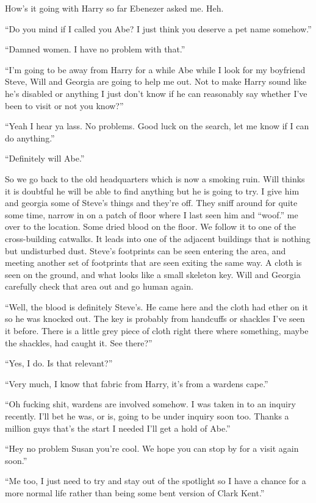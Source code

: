 \lettrine[lines=2,lraise=0]{H}ow's it going with Harry so far Ebenezer asked me. Heh.

``Do you mind if I called you Abe? I just think you deserve a pet name somehow.''

``Damned women. I have no problem with that.''

``I'm going to be away from Harry for a while Abe while I look for my boyfriend Steve, Will and Georgia are going to help me out. Not to make Harry sound like he's disabled or anything I just don't know if he can reasonably say whether I've been to visit or not you know?''

``Yeah I hear ya lass. No problems. Good luck on the search, let me know if I can do anything.''

``Definitely will Abe.''

So we go back to the old headquarters which is now a smoking ruin. Will thinks it is doubtful he will be able to find anything but he is going to try. I give him and georgia some of Steve's things and they're off. They sniff around for quite some time, narrow in on a patch of floor where I last seen him and ``woof.'' me over to the location. Some dried blood on the floor. We follow it to one of the cross-building catwalks. It leads into one of the adjacent buildings that is nothing but undisturbed dust. Steve's footprints can be seen entering the area, and meeting another set of footprints that are seen exiting the same way. A cloth is seen on the ground, and what looks like a small skeleton key. Will and Georgia carefully check that area out and go human again.

``Well, the blood is definitely Steve's. He came here and the cloth had ether on it so he was knocked out. The key is probably from handcuffs or shackles I've seen it before. There is a little grey piece of cloth right there where something, maybe the shackles, had caught it. See there?''

``Yes, I do. Is that relevant?''

``Very much, I know that fabric from Harry, it's from a wardens cape.''

``Oh fucking shit, wardens are involved somehow. I was taken in to an inquiry recently. I'll bet he was, or is, going to be under inquiry soon too. Thanks a million guys that's the start I needed I'll get a hold of Abe.''

``Hey no problem Susan you're cool. We hope you can stop by for a visit again soon.''

``Me too, I just need to try and stay out of the spotlight so I have a chance for a more normal life rather than being some bent version of Clark Kent.''

